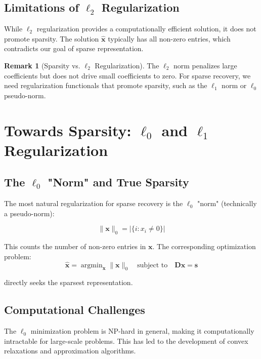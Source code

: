 \documentclass[12pt]{article}
\renewcommand{\vec}[1]{\mathbf{#1}}
\DeclareMathOperator{\argmin}{argmin}
\theoremstyle{definition}
\newtheorem{remark}[theorem]{Remark}
\begin{document}
\subsection{Limitations of $\ell_2$ Regularization}

While $\ell_2$ regularization provides a computationally efficient solution, it does not promote sparsity. The solution $\hat{\vec{x}}$ typically has all non-zero entries, which contradicts our goal of sparse representation.

\begin{remark}[Sparsity vs. $\ell_2$ Regularization]
    The $\ell_2$ norm penalizes large coefficients but does not drive small coefficients to zero. For sparse recovery, we need regularization functionals that promote sparsity, such as the $\ell_1$ norm or $\ell_0$ pseudo-norm.
\end{remark}

\newpage

\section{Towards Sparsity: $\ell_0$ and $\ell_1$ Regularization}

\subsection{The $\ell_0$ "Norm" and True Sparsity}

The most natural regularization for sparse recovery is the $\ell_0$ "norm" (technically a pseudo-norm):

\begin{equation}
    \|\vec{x}\|_0 = |\{i : x_i \neq 0\}|
\end{equation}

This counts the number of non-zero entries in $\vec{x}$. The corresponding optimization problem:
\begin{equation}
    \hat{\vec{x}} = \argmin_{\vec{x}} \|\vec{x}\|_0 \quad \text{subject to} \quad \mathbf{D}\vec{x} = \vec{s}
\end{equation}

directly seeks the sparsest representation.

\subsection{Computational Challenges}

The $\ell_0$ minimization problem is NP-hard in general, making it computationally intractable for large-scale problems. This has led to the development of convex relaxations and approximation algorithms.
\end{document}
